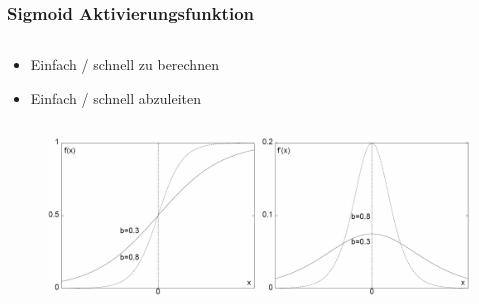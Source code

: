 \begin{frame}[fragile]
\frametitle{Sigmoid Aktivierungsfunktion}

\begin{columns}

\begin{column}{.5\textwidth}
\begin{itemize}
\item Einfach / schnell zu berechnen
\item Einfach / schnell abzuleiten
\end{itemize}
\end{column}

\begin{column}{.5\textwidth}
\end{column}

\end{columns}

\begin{figure}
	\includegraphics[width=\linewidth]{./zusatz/multilayerPerceptron/img/plotSigmoid_alpha}
\end{figure}


\end{frame}

